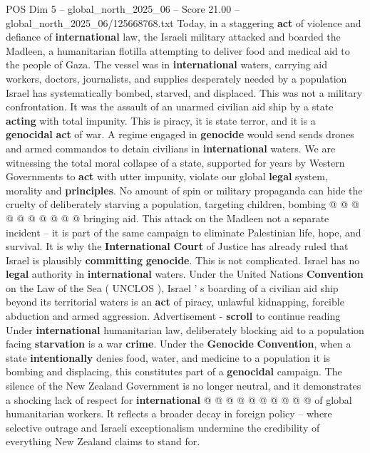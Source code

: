 \begin{textsample}{POS Dim 5 – global\_north\_2025\_06 – Score 21.00 – global\_north\_2025\_06/125668768.txt}  \label{ex:f5_pos_064}
Today, in a staggering \textbf{act} of violence and defiance of \textbf{international} law, the Israeli military attacked and boarded the Madleen, a humanitarian flotilla attempting to deliver food and medical aid to the people of Gaza.
The vessel was in \textbf{international} waters, carrying aid workers, doctors, journalists, and supplies desperately needed by a population Israel has systematically bombed, starved, and displaced.
This was not a military confrontation.
It was the assault of an unarmed civilian aid ship by a state \textbf{acting} with total impunity.
This is piracy, it is state terror, and it is a \textbf{genocidal} \textbf{act} of war.
A regime engaged in \textbf{genocide} would send sends drones and armed commandos to detain civilians in \textbf{international} waters.
We are witnessing the total moral collapse of a state, supported for years by Western Governments to \textbf{act} with utter impunity, violate our global \textbf{legal} system, morality and \textbf{principles}.
No amount of spin or military propaganda can hide the cruelty of deliberately starving a population, targeting children, bombing @ @ @ @ @ @ @ @ @ @ bringing aid.
This attack on the Madleen not a separate incident -- it is part of the same campaign to eliminate Palestinian life, hope, and survival.
It is why the \textbf{International} \textbf{Court} of Justice has already ruled that Israel is plausibly \textbf{committing} \textbf{genocide}.
This is not complicated.
Israel has no \textbf{legal} authority in \textbf{international} waters.
Under the United Nations \textbf{Convention} on the Law of the Sea ( UNCLOS ), Israel ' s boarding of a civilian aid ship beyond its territorial waters is an \textbf{act} of piracy, unlawful kidnapping, forcible abduction and armed aggression.
Advertisement - \textbf{scroll} to continue reading Under \textbf{international} humanitarian law, deliberately blocking aid to a population facing \textbf{starvation} is a war \textbf{crime}.
Under the \textbf{Genocide} \textbf{Convention}, when a state \textbf{intentionally} denies food, water, and medicine to a population it is bombing and displacing, this constitutes part of a \textbf{genocidal} campaign.
The silence of the New Zealand Government is no longer neutral, and it demonstrates a shocking lack of respect for \textbf{international} @ @ @ @ @ @ @ @ @ @ of global humanitarian workers.
It reflects a broader decay in foreign policy -- where selective outrage and Israeli exceptionalism undermine the credibility of everything New Zealand claims to stand for.

\end{textsample}
